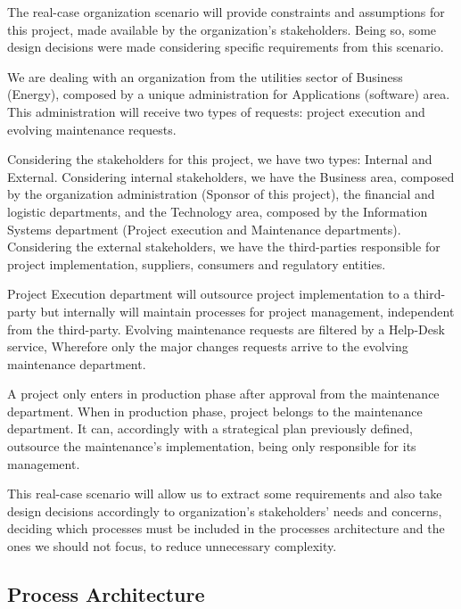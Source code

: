 The real-case organization scenario will provide constraints and assumptions for this project, made available by the organization's stakeholders. Being so, some design decisions were made considering specific requirements from this scenario.\par
We are dealing with an organization from the utilities sector of Business (Energy), composed by a unique administration for Applications (software) area. This administration will receive two types of requests: project execution and evolving maintenance requests.\par
Considering the stakeholders for this project, we have two types: Internal and External. Considering internal stakeholders, we have the Business area, composed by the organization administration (Sponsor of this project), the financial and logistic departments, and the Technology area, composed by the Information Systems department (Project execution and Maintenance departments). Considering the external stakeholders, we have the third-parties responsible for project implementation, suppliers, consumers and regulatory entities.\par
Project Execution department will outsource project implementation to a third-party but internally will maintain processes for project management, independent from the third-party. Evolving maintenance requests are filtered by a Help-Desk service, Wherefore only the major changes requests arrive to the evolving maintenance department.\par
A project only enters in production phase after approval from the maintenance department. When in production phase, project belongs to the maintenance department. It can, accordingly with a strategical plan previously defined, outsource the maintenance's implementation, being only responsible for its management.\par
This real-case scenario will allow us to extract some requirements and also take design decisions accordingly to organization's stakeholders' needs and concerns, deciding which processes must be included in the processes architecture and the ones we should not focus, to reduce unnecessary complexity.\par


\subsection{Process Architecture}

